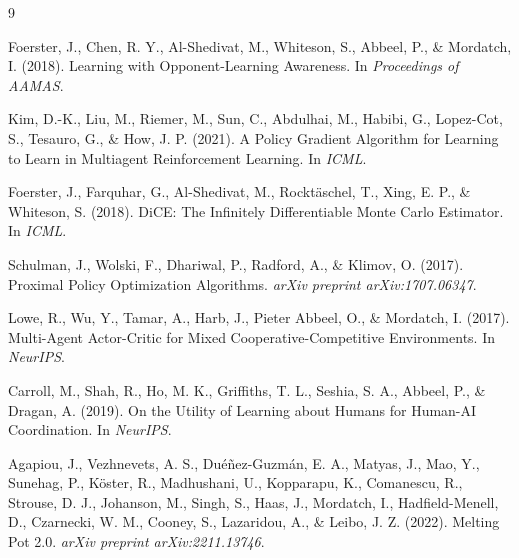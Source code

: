 \documentclass[11pt,a4paper]{article}
\begin{document}
\begin{thebibliography}{9}

Foerster, J., Chen, R. Y., Al-Shedivat, M., Whiteson, S., Abbeel, P., \& Mordatch, I. (2018).
Learning with Opponent-Learning Awareness. In \emph{Proceedings of AAMAS}.

Kim, D.-K., Liu, M., Riemer, M., Sun, C., Abdulhai, M., Habibi, G., Lopez-Cot, S., Tesauro, G., \& How, J. P. (2021).
A Policy Gradient Algorithm for Learning to Learn in Multiagent Reinforcement Learning. In \emph{ICML}.

Foerster, J., Farquhar, G., Al-Shedivat, M., Rocktäschel, T., Xing, E. P., \& Whiteson, S. (2018).
DiCE: The Infinitely Differentiable Monte Carlo Estimator. In \emph{ICML}.

Schulman, J., Wolski, F., Dhariwal, P., Radford, A., \& Klimov, O. (2017).
Proximal Policy Optimization Algorithms. \emph{arXiv preprint arXiv:1707.06347}.

Lowe, R., Wu, Y., Tamar, A., Harb, J., Pieter Abbeel, O., \& Mordatch, I. (2017).
Multi-Agent Actor-Critic for Mixed Cooperative-Competitive Environments. In \emph{NeurIPS}.

Carroll, M., Shah, R., Ho, M. K., Griffiths, T. L., Seshia, S. A., Abbeel, P., \& Dragan, A. (2019).
On the Utility of Learning about Humans for Human-AI Coordination. In \emph{NeurIPS}.

Agapiou, J., Vezhnevets, A. S., Du{\'e}{\~n}ez-Guzm{\'a}n, E. A., Matyas, J., Mao, Y., Sunehag, P., Köster, R., Madhushani, U., Kopparapu, K., Comanescu, R., Strouse, D. J., Johanson, M., Singh, S., Haas, J., Mordatch, I., Hadfield-Menell, D., Czarnecki, W. M., Cooney, S., Lazaridou, A., \& Leibo, J. Z. (2022).
Melting Pot 2.0. \emph{arXiv preprint arXiv:2211.13746}.

\end{thebibliography}
\end{document}
